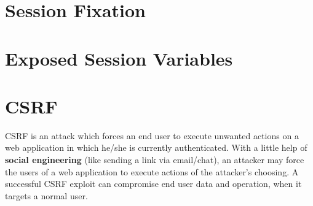 	\section{Session Fixation}

	\section{Exposed Session Variables}

	\section{CSRF}

		CSRF is an attack which forces an end user to execute unwanted actions on a web application 
		in which he/she is currently authenticated. With a little help of {\bf social engineering} 
		(like sending a link via email/chat), an attacker may force the users of a web application 
		to execute actions of the attacker's choosing. A successful CSRF exploit can compromise end 
		user data and operation, when it targets a normal user. 